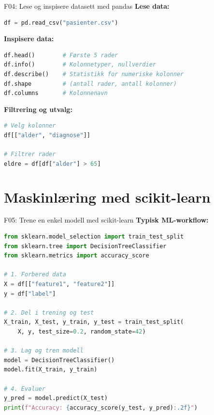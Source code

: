 \documentclass[aspectratio=169, 10pt]{beamer}
\begin{document}
\begin{frame}[fragile]{F04: Lese og inspisere datasett med pandas}
    \textbf{Lese data:}
    \begin{lstlisting}[language=Python]
df = pd.read_csv("pasienter.csv")
    \end{lstlisting}
    
    \textbf{Inspisere data:}
    \begin{lstlisting}[language=Python]
df.head()        # Første 5 rader
df.info()        # Kolonnetyper, nullverdier
df.describe()    # Statistikk for numeriske kolonner
df.shape         # (antall rader, antall kolonner)
df.columns       # Kolonnenavn
    \end{lstlisting}
    
    \textbf{Filtrering og utvalg:}
    \begin{lstlisting}[language=Python]
# Velg kolonner
df[["alder", "diagnose"]]

# Filtrer rader
eldre = df[df["alder"] > 65]
    \end{lstlisting}
\end{frame}

\section{Maskinlæring med scikit-learn}

\begin{frame}[fragile]{F05: Trene en enkel modell med scikit-learn}
    \textbf{Typisk ML-workflow:}
    \begin{lstlisting}[language=Python]
from sklearn.model_selection import train_test_split
from sklearn.tree import DecisionTreeClassifier
from sklearn.metrics import accuracy_score

# 1. Forbered data
X = df[["feature1", "feature2"]]
y = df["label"]

# 2. Del i trening og test
X_train, X_test, y_train, y_test = train_test_split(
    X, y, test_size=0.2, random_state=42)

# 3. Lag og tren modell
model = DecisionTreeClassifier()
model.fit(X_train, y_train)

# 4. Evaluer
y_pred = model.predict(X_test)
print(f"Accuracy: {accuracy_score(y_test, y_pred):.2f}")
    \end{lstlisting}
\end{frame}
\end{document}
